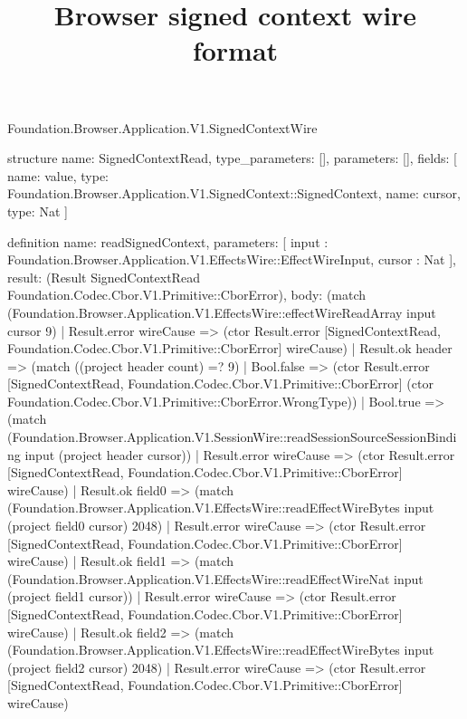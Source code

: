 \begin{lexlean}{Foundation.Browser.Application.V1.SignedContextWire}
\title{Browser signed context wire format}
\begin{semanticmodule}
structure{
  name: SignedContextRead,
  type_parameters: [],
  parameters: [],
  fields: [
    {name: value, type: Foundation.Browser.Application.V1.SignedContext::SignedContext},
    {name: cursor, type: Nat}
  ]
}

definition{
  name: readSignedContext,
  parameters: [
    input : Foundation.Browser.Application.V1.EffectsWire::EffectWireInput,
    cursor : Nat
  ],
  result: (Result SignedContextRead Foundation.Codec.Cbor.V1.Primitive::CborError),
  body: (match (Foundation.Browser.Application.V1.EffectsWire::effectWireReadArray input cursor 9)
    | Result.error wireCause => (ctor Result.error [SignedContextRead, Foundation.Codec.Cbor.V1.Primitive::CborError] wireCause)
    | Result.ok header => (match ((project header count) =? 9)
      | Bool.false => (ctor Result.error [SignedContextRead, Foundation.Codec.Cbor.V1.Primitive::CborError] (ctor Foundation.Codec.Cbor.V1.Primitive::CborError.WrongType))
      | Bool.true => (match (Foundation.Browser.Application.V1.SessionWire::readSessionSourceSessionBinding input (project header cursor))
        | Result.error wireCause => (ctor Result.error [SignedContextRead, Foundation.Codec.Cbor.V1.Primitive::CborError] wireCause)
        | Result.ok field0 => (match (Foundation.Browser.Application.V1.EffectsWire::readEffectWireBytes input (project field0 cursor) 2048)
          | Result.error wireCause => (ctor Result.error [SignedContextRead, Foundation.Codec.Cbor.V1.Primitive::CborError] wireCause)
          | Result.ok field1 => (match (Foundation.Browser.Application.V1.EffectsWire::readEffectWireNat input (project field1 cursor))
            | Result.error wireCause => (ctor Result.error [SignedContextRead, Foundation.Codec.Cbor.V1.Primitive::CborError] wireCause)
            | Result.ok field2 => (match (Foundation.Browser.Application.V1.EffectsWire::readEffectWireBytes input (project field2 cursor) 2048)
              | Result.error wireCause => (ctor Result.error [SignedContextRead, Foundation.Codec.Cbor.V1.Primitive::CborError] wireCause)
}
\end{semanticmodule}
\end{lexlean}
